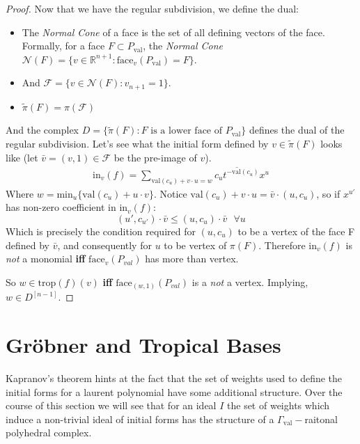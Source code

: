 \begin{proof}
       Now that we have the regular subdivision, we define the dual:
       \begin{itemize}
           \item The \textit{Normal Cone} of a face is the set of all defining vectors of the face.
               Formally, for a face $F \subset P_{\text{val}}$, the \textit{Normal Cone} $\mathcal{N}(F) = \{v \in \mathbb{R}^{n+1}: \text{face}_v(P_{\text{val}}) = F\}$.
           \item And $\mathcal{F} = \{v \in \mathcal{N}(F): v_{n+1} = 1\}$.
           \item $\tilde{\pi}(F) = \pi(\mathcal{F})$
       \end{itemize}
       And the complex $D = \{\tilde{\pi}(F) : F \text{ is a lower face of }P_{\text{val}}\}$ defines the dual of the regular subdivision. 
       Let's see what the initial form defined by $v \in \tilde{\pi}(F)$ looks like (let $\bar{v} = (v,1) \in \mathcal{F}$ be the pre-image of $v$).
       \begin{align*}
           \text{in}_v(f) = \sum_{\text{val}(c_u) + v \cdot u = w} \overline{c_u t^{-\text{val}(c_u)}} x^u
       \end{align*}
       Where $w = \text{min}_{u}\{\text{val}(c_u) + u\cdot v\}$. 
       Notice $\text{val}(c_u) + v \cdot u = \bar v \cdot (u,c_u)$, 
       so if $x^{u'}$ has non-zero coefficient in $\text{in}_v(f)$: 
       \begin{equation*}
           (u',c_{u'})\cdot \bar{v} \leq (u,c_u) \cdot \bar{v}~~~\forall u
       \end{equation*}
       Which is precisely the condition required for $(u,c_u)$ to be a vertex of the face F defined by $\bar v$, and consequently for $u$ to be vertex of $\pi(F)$. 
       Therefore $\text{in}_{v}(f)$ is \textit{not} a monomial \textbf{iff} $\text{face}_v(P_{val})$ has more than vertex.
       \par So $w\in \text{trop}(f)(v)$ \textbf{iff} $\text{face}_{(w,1)}(P_{val})$ is a \textit{not} a vertex. 
       Implying, $w \in D^{[n-1]}$.
   \end{proof}

\section{Gr\"{o}bner and Tropical Bases}  
Kapranov's theorem hints at the fact that the set of weights used to define the initial forms for a laurent polynomial have some additional structure. 
Over the course of this section we will see that for an ideal $I$ the set of weights which induce a non-trivial ideal of initial forms has the structure of a $\Gamma_{\text{val}}-$raitonal polyhedral complex.


